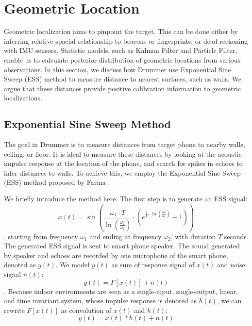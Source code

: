 \section{Geometric Location}
\label{sec:geo}

Geometric localization aims to pinpoint the target. This can be done either by 
inferring relative spacial relationship to beacons or fingerprints, or dead-reckoning
with IMU sensors. Statistic models, such as Kalman Filter and Particle Filter, 
enable us to calculate posterior distribution of geometric locations from various observations.
In this section, we discuss how Drummer use Exponential Sine Sweep (ESS) method to measure 
distance to nearest surfaces, such as walls. We argue that these distances provide positive calibration 
information to geometric localizations.


\subsection{Exponential Sine Sweep Method}

The goal in Drummer is to measure distances from target phone to nearby walls, ceiling, or floor.
It is ideal to measure these distances by looking at the acoustic impulse response at the location of 
the phone, and search for spikes in echoes to infer distances to walls. 
To achieve this, we employ the Exponential Sine Sweep (ESS)
method proposed by Farina \cite{farina2000simultaneous}. 


We briefly introduce the method here. The first step is to generate an ESS signal:
\begin{equation}
x(t) = \sin \left(\frac{\omega_1 \cdot T}{\ln \left(\frac{\omega_2}{\omega_1}\right)} \cdot \left(e^{\frac{t}{T} \cdot \ln \left(\frac{\omega_2}{\omega_1}\right)} - 1 \right)\right)
\end{equation}
, starting from frequency $\omega_1$ and ending at frequency $\omega_2$, with duration $T$ seconds. 
The generated ESS signal is sent to smart phone speaker. The sound generated by speaker and echoes are
recorded by one microphone of the smart phone, denoted as $y(t)$.  
We model $y(t)$ as sum of response signal of $x(t)$ and noise signal $n(t)$:
\begin{equation}
y(t) = F[x(t)] + n(t)
\end{equation}
. Because indoor environments are seen as a single-input, single-output, linear, and time invariant system, whose impulse 
response is denoted as $h(t)$, we can rewrite $F[x(t)]$ as convolution of $x(t)$ and $h(t)$:
\begin{equation}
y(t) = x(t) \ast h(t) + n(t)
\end{equation}


